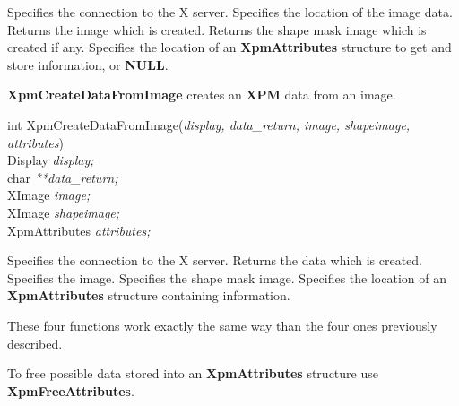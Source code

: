 \begin{description}

 Specifies the connection to the X server.
 Specifies the location of the image data.
 Returns the image which is created.
 Returns the shape mask image which is created if
any.
 Specifies the location of an {\bf XpmAttributes} structure
to get and store information, or {\bf NULL}. 

\end{description} 

\vspace{.5cm}
{\bf XpmCreateDataFromImage} creates an {\bf XPM} data from an image.

\begin{flushleft}

int XpmCreateDataFromImage({\it display, data\_return, image, shapeimage,\\
\hspace{3cm}attributes})\\

\hspace{1cm}Display {\it *display;}\\
\hspace{1cm}char {\it ***data\_return;}\\
\hspace{1cm}XImage {\it *image;}\\
\hspace{1cm}XImage {\it *shapeimage;}\\
\hspace{1cm}XpmAttributes {\it *attributes;}

\end{flushleft}

\begin{description}

 Specifies the connection to the X server.
 Returns the data which is created.
 Specifies the image.
 Specifies the shape mask image.
 Specifies the location of an {\bf XpmAttributes} structure
containing information.

\end{description} 

These four functions work exactly the same way than the four ones previously
described.

\vspace{.5cm}
To free possible data stored into an {\bf XpmAttributes} structure use {\bf
XpmFreeAttributes}.


